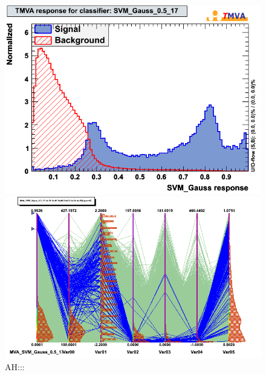 \documentclass[a4paper]{jpconf}
\begin{document}
 
\begin{figure}[h]
 \begin{minipage}{7.0cm}
\includegraphics[width=1.0\textwidth]{images/mk_svm_gauss2.png}
\end{minipage}
 \hfill
\begin{minipage}{7.0cm}
\includegraphics[width=1.0\textwidth]{images/svm_parallels2.png}
\end{minipage}
\begin{minipage}{3.0cm}
\caption{AH:::}
\end{minipage}
\label{fig:ahCorrelationMatrix}
\end{figure}
\end{document}

